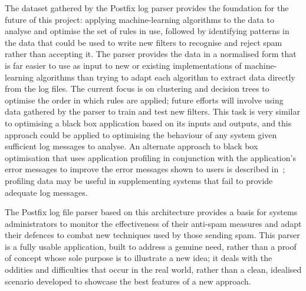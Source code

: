 \documentclass{svmult}
\begin{document}
The dataset gathered by the Postfix log parser provides the foundation for
the future of this project: applying machine-learning algorithms to the
data to analyse and optimise the set of rules in use, followed by
identifying patterns in the data that could be used to write new filters
to recognise and reject spam rather than accepting it.  The parser provides
the data in a normalised form that is far easier to use as input to new or
existing implementations of machine-learning algorithms than trying to
adapt each algorithm to extract data directly from the log files.  The
current focus is on clustering and decision trees to optimise the order in
which rules are applied; future efforts will involve using data gathered by
the parser to train and test new filters.  This task is very similar to
optimising a black box application based on its inputs and outputs, and
this approach could be applied to optimising the behaviour of any system
given sufficient log messages to analyse.  An alternate approach to black
box optimisation that uses application profiling in conjunction with the
application's error messages to improve the error messages shown to users
is described in~\cite{black-box-error-reporting}; profiling data may be
useful in supplementing systems that fail to provide adequate log
messages.

The Postfix log file parser based on this architecture provides a basis for
systems administrators to monitor the effectiveness of their anti-spam
measures and adapt their defences to combat new techniques used by those
sending spam.  This parser is a fully usable application, built to address
a genuine need, rather than a proof of concept whose sole purpose is to
illustrate a new idea; it deals with the oddities and difficulties that
occur in the real world, rather than a clean, idealised scenario developed
to showcase the best features of a new approach.



\end{document}

